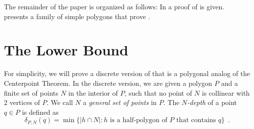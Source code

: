 \documentclass{article}
\begin{document}
The remainder of the paper is organized as follows: In
 a proof of  is given.
 presents a family of simple polygons that prove
.

\section{The Lower Bound}

For simplicity, we will prove a discrete version of
 that is a polygonal analog of the Centerpoint
Theorem.  In the discrete version, we are given a polygon $P$ and a
finite set of points $N$ in the interior of $P$, such that no point of
$N$ is collinear with 2 vertices of $P$.  We call $N$ a \emph{general
set of points} in $P$. The \emph{$N$-depth} of a point $q\in P$ is
defined as 
\[
     \delta_{P,N}(q) = \min\{|h\cap N| : \mbox{$h$ is a half-polygon
	of $P$ that contains $q$} \} \enspace .
\]
\end{document}
